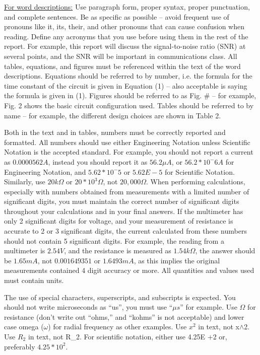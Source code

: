 \documentclass[11pt]{ECEtemp}
\begin{document}
\underline{For word descriptions:}  Use paragraph form, proper syntax, proper punctuation, and complete sentences.  Be as specific as possible – avoid frequent use of pronouns like it, its, their, and other pronouns that can cause confusion when reading. Define any acronyms that you use before using them in the rest of the report. For example, this report will discuss the signal-to-noise ratio (SNR) at several points, and the SNR will be important in communications class. All tables, equations, and figures must be referenced within the text of the word descriptions.  Equations should be referred to by number, i.e. the formula for the time constant of the circuit is given in Equation (1) – also acceptable is saying the formula is given in (1). Figures should be referred to as Fig. \# -- for example, Fig. 2 shows the basic circuit configuration used. Tables should be referred to by name – for example, the different design choices are shown in Table 2. 

Both in the text and in tables, numbers must be correctly reported and formatted. 
All numbers should use either Engineering Notation unless Scientific Notation is the accepted standard.  
For example, you should not report a current as $0.0000562 A$, instead you should report it as $56.2 \mu A$, or $56.2*10^-6 A$ for Engineering Notation, and $5.62*10^-5$ or $5.62E-5$ for Scientific Notation. 
Similarly, use $20 k \Omega$ or $20*10^3 \Omega$, not $20,000 \Omega$. When performing calculations, especially with numbers obtained from measurements with a limited number of significant digits, you must maintain the correct number of significant digits throughout your calculations and in your final answers.  
If the multimeter has only 2 significant digits for voltage, and your measurement of resistance is accurate to 2 or 3 significant digits, the current calculated from these numbers should not contain 5 significant digits.  
For example, the reading from a multimeter is $2.54 V$, and the resistance is measured as $1.54 k \Omega$, the answer should be $1.65 mA$, not $0.001649351$ or $1.6493 mA$, as this implies the original measurements contained 4 digit accuracy or more. 
All quantities and values used must contain units.

The use of special characters, superscripts, and subscripts is expected.  You should not write microseconds as “us”, you must use “$\mu s$” for example.  
Use $\Omega$ for resistance (don’t write out “ohms,” and “kohms” is not acceptable) and lower case omega ($\omega$) for radial frequency as other examples.  Use $x^2$ in text, not x$\wedge$2.  
Use $R_2$ in text, not R\_2.  For scientific notation, either use 4.25E $+$2 or, preferably $4.25*10^2$.  
\end{document}
